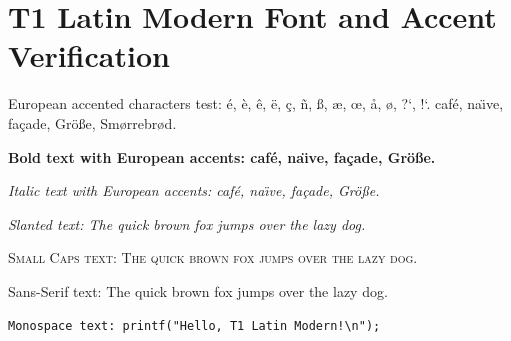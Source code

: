 \documentclass{article}
\begin{document}
\section{T1 Latin Modern Font and Accent Verification}

European accented characters test:
\'e, \`e, \^e, \"e, \c{c}, \~n, \ss, \ae, \oe, \aa, \o, ?`, !`.
caf\'e, na\"\i ve, fa\c{c}ade, Gr\"o\ss e, Sm\o rrebr\o d.

\textbf{Bold text with European accents: caf\'e, na\"\i ve, fa\c{c}ade, Gr\"o\ss e.}

\textit{Italic text with European accents: caf\'e, na\"\i ve, fa\c{c}ade, Gr\"o\ss e.}

\textsl{Slanted text: The quick brown fox jumps over the lazy dog.}

\textsc{Small Caps text: The quick brown fox jumps over the lazy dog.}

\textsf{Sans-Serif text: The quick brown fox jumps over the lazy dog.}

\texttt{Monospace text: printf("Hello, T1 Latin Modern!\textbackslash n");}
\end{document}
